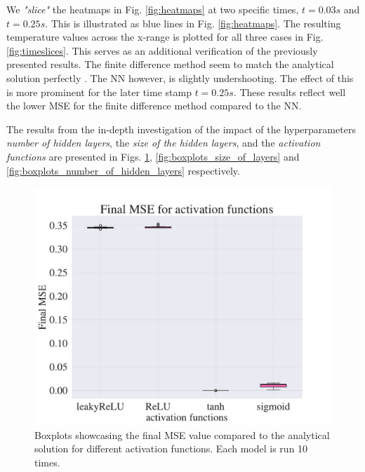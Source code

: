 We \textit{"slice"} the heatmaps in Fig. \ref{fig:heatmaps} at two specific times, $t = 0.03 s$ and $t = 0.25 s$. 
This is illustrated as blue lines in Fig. \ref{fig:heatmaps}.
The resulting temperature values across the x-range is plotted for all three cases in Fig. \ref{fig:timeslices}.
This serves as an additional verification of the previously presented results. 
The finite difference method seem to match the analytical solution perfectly .
The NN however, is slightly undershooting. 
The effect of this is more prominent for the later time stamp $t = 0.25 s$. 
These results reflect well the lower MSE for the finite difference method compared to the NN. 





The results from the in-depth investigation of the impact of the hyperparameters \textit{number of hidden layers}, the \textit{size of the hidden layers}, and the \textit{activation functions} are presented in Figs. \ref{fig:boxplots_activations}, \ref{fig:boxplots_size_of_layers} and \ref{fig:boxplots_number_of_hidden_layers} respectively. 


\begin{figure}[h!]
    \centering
    \includegraphics[width=1.0\linewidth]{project_3/plots/activation_search.pdf}
    \caption{Boxplots showcasing the final MSE value compared to the analytical solution for different activation functions. Each model is run 10 times.}
    \label{fig:boxplots_activations}
\end{figure}

